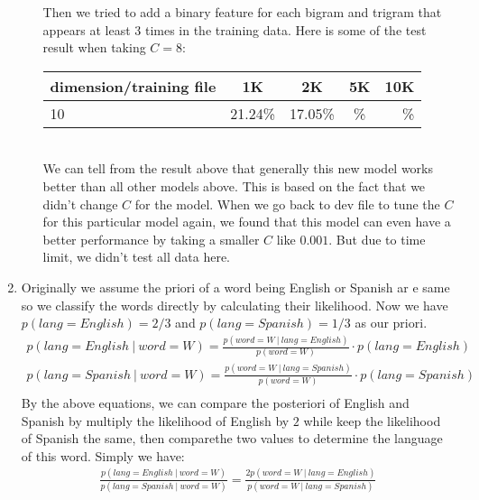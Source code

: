 \documentclass[10pt]{article}
\begin{document}
\begin{enumerate}
\begin{enumerate}
            Then we tried to add a binary feature for each bigram and trigram that appears at least 3 times in the training data. Here is some of the test result when taking $C = 8$:\\
            
              \begin{tabular}{| l | c | c | c | r |}
                \hline
                dimension/training file  & 1K & 2K & 5K & 10K \\ \hline
                10 & 21.24\% & 17.05\% & \% & \%\\ \hline
              \end{tabular} \\            
              
        We can tell from the result above that generally this new model works better than all other models above. This is based on the fact that we didn't change $C$ for the model. When we go back to dev file to tune the $C$ for this particular model again, we found that this model can even have a better performance by taking a smaller $C$ like $0.001$. But due to time limit, we didn't test all data here.
        
        \end{enumerate}
        
    \item %
    Originally we assume the priori of a word being English or Spanish ar e same so we classify the words directly by calculating their likelihood. Now we have $p(lang = English) = 2/3$ and $p(lang = Spanish) = 1/3$ as our priori. 
        \begin{gather*}
            p(lang = English\ |\ word = W) = \frac{p(word = W\ |\ lang = English)}{p(word = W)}\cdot p(lang = English)\\
            p(lang = Spanish\ |\ word = W) = \frac{p(word = W\ |\ lang = Spanish)}{p(word = W)}\cdot p(lang = Spanish)\\
        \end{gather*}
        By the above equations, we can compare the posteriori of English and Spanish by  multiply the likelihood of English by $2$ while keep the likelihood of Spanish the same, then comparethe two values to determine the language of this word. Simply we have:
          \begin{gather*}
            \frac{p(lang = English\ |\ word = W)}{p(lang = Spanish\ |\ word = W)} = \frac{2p(word = W\ |\ lang = English)}{p(word = W\ |\ lang = Spanish)} 
        \end{gather*}
        

\end{enumerate}
\end{document}
